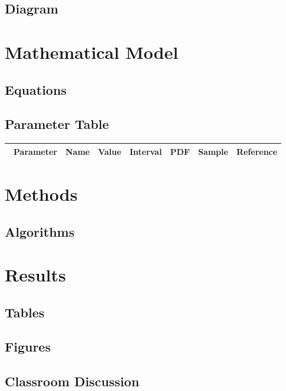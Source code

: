 \subsection{Diagram}

\section{Mathematical Model}

\subsection{Equations}

\subsection{Parameter Table}

\begin{table}[H]\centering
\begin{tabular}{p{1cm}p{1cm}p{1cm}p{1cm}p{1cm}p{1cm}p{4cm}}\
Parameter & Name & Value & Interval & PDF & Sample & Reference \\
\hline
\hline
\end{tabular}
\end{table}

\section{Methods}

\subsection{Algorithms}

\section{Results}

\subsection{Tables}

\subsection{Figures}

\subsection{Classroom Discussion}

